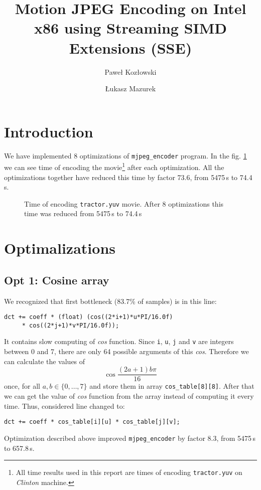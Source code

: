 \documentclass[11pt]{article}
\title{Motion JPEG Encoding on Intel x86 using Streaming SIMD Extensions (SSE)}
\author{Paweł Kozłowski \and Łukasz Mazurek}
\begin{document}
\maketitle

\section{Introduction}
We have implemented 8 optimizations of \texttt{mjpeg\_encoder} program.
In the fig. \ref{times_plot} we can see time of encoding the movie\footnote{All time results used in this report are times of encoding \texttt{tractor.yuv} on \emph{Clinton} machine.} after each optimization.
All the optimizations together have reduced this time by factor 73.6, from 5475\,s to 74.4\,s.

\begin{figure}[h]
	\centering
	
	\caption{Time of encoding \texttt{tractor.yuv} movie. After 8 optimizations this time was reduced from 5475\,s to 74.4\,s}
	\label{times_plot}
\end{figure}


\section{Optimalizations}
\subsection{Opt 1: Cosine array}
We recognized that first bottleneck (83.7\% of samples) is in this line:

\begin{lstlisting}
dct += coeff * (float) (cos((2*i+1)*u*PI/16.0f) 
     * cos((2*j+1)*v*PI/16.0f));
\end{lstlisting}
It contains slow computing of \emph{cos} function.
Since \texttt{i}, \texttt{u}, \texttt{j} and \texttt{v} are integers between 0 and 7, there are only 64 possible arguments of this \emph{cos}.
Therefore we can calculate the values of 
$$\cos \frac{(2a + 1) b \pi}{16}$$
once, for all $a, b \in \{0, \ldots, 7 \}$ and store them in array \texttt{cos\_table[8][8]}.
After that we can get the value of \emph{cos} function from the array instead of computing it every time.
Thus, considered line changed to:
\begin{lstlisting}
dct += coeff * cos_table[i][u] * cos_table[j][v];
\end{lstlisting}

Optimization described above improved \texttt{mjpeg\_encoder} by factor 8.3, from 5475\,s to 657.8\,s.
\end{document}

